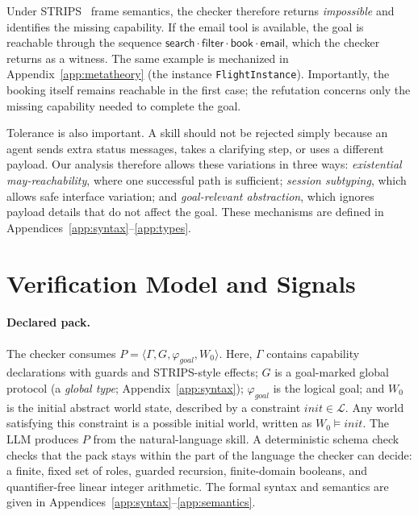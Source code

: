 \documentclass{article}
\theoremstyle{plain}
\theoremstyle{definition}
\newcommand{\gphi}{\varphi_{\mathit{goal}}}
\newcommand{\id}[1]{\texttt{#1}}
\def \bgc {}
\def \egc {}
\begin{document}
Under STRIPS~\cite{strips} frame semantics, the checker therefore returns \emph{impossible} and identifies the missing capability. If the email tool is available, the goal is reachable through the sequence $\mathsf{search}\cdot\mathsf{filter}\cdot\mathsf{book}\cdot\mathsf{email}$, which the checker returns as a witness. The same example is mechanized in Appendix~\ref{app:metatheory} (the instance \id{FlightInstance}). Importantly, the booking itself remains reachable in the first case; the refutation concerns only the missing capability needed to complete the goal.

Tolerance is also important. A skill should not be rejected simply because an agent sends extra status messages, takes a clarifying step, or uses a different payload. Our analysis therefore allows these variations in three ways: \emph{existential may-reachability}, where one successful path is sufficient; \emph{session subtyping}, which allows safe interface variation; and \emph{goal-relevant abstraction}, which ignores payload details that do not affect the goal. These mechanisms are defined in Appendices~\ref{app:syntax}--\ref{app:types}.

\section{Verification Model and Signals}\label{sec:model}

\paragraph{Declared pack.}
The checker consumes
$P=\langle\Gamma,G,\gphi,W_0\rangle$. Here, $\Gamma$ contains capability
declarations with guards and STRIPS-style effects; $G$ is a goal-marked global
protocol (a \emph{global type}; Appendix~\ref{app:syntax}); $\gphi$ is the
logical goal; and $W_0$ is the initial abstract world state\bgc, described by a
constraint $\mathit{init}\in\mathcal L$. Any world satisfying this constraint
is a possible initial world, written as $W_0\vDash\mathit{init}$\egc. The LLM
produces $P$ from the natural-language skill. A deterministic schema check
checks that the pack stays within the part of the language the checker can
decide: a finite, fixed set of roles, guarded recursion, finite-domain
booleans, and quantifier-free linear integer arithmetic. The formal syntax and
semantics are given in Appendices~\ref{app:syntax}--\ref{app:semantics}.
\end{document}

